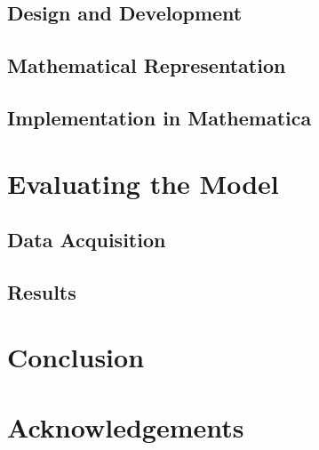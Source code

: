 \documentclass[11pt]{article}
\begin{document}
      \subsection{Design and Development}
      \subsection{Mathematical Representation}
      \subsection{Implementation in Mathematica}
    \section{Evaluating the Model}
      \subsection{Data Acquisition}
      \subsection{Results}
    \section{Conclusion}
    
    \clearpage
    \section*{Acknowledgements}
    \nocite{*} %
    
  
\end{document}
